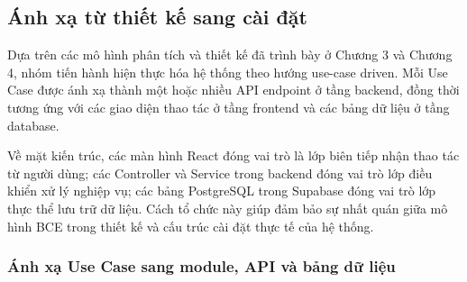 \subsection{Ánh xạ từ thiết kế sang cài đặt}

Dựa trên các mô hình phân tích và thiết kế đã trình bày ở Chương 3 và Chương 4, nhóm tiến hành hiện thực hóa hệ thống theo hướng use-case driven. Mỗi Use Case được ánh xạ thành một hoặc nhiều API endpoint ở tầng backend, đồng thời tương ứng với các giao diện thao tác ở tầng frontend và các bảng dữ liệu ở tầng database.

Về mặt kiến trúc, các màn hình React đóng vai trò là lớp biên tiếp nhận thao tác từ người dùng; các Controller và Service trong backend đóng vai trò lớp điều khiển xử lý nghiệp vụ; các bảng PostgreSQL trong Supabase đóng vai trò lớp thực thể lưu trữ dữ liệu. Cách tổ chức này giúp đảm bảo sự nhất quán giữa mô hình BCE trong thiết kế và cấu trúc cài đặt thực tế của hệ thống.

\subsubsection{Ánh xạ Use Case sang module, API và bảng dữ liệu}

